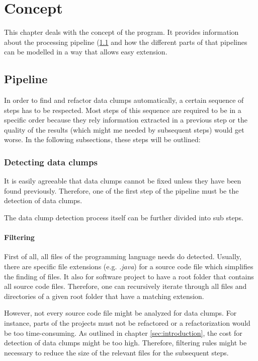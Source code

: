 \begingroup
\renewcommand{\cleardoublepage}{} %
\renewcommand{\clearpage}{}
\chapter{Concept}\label{chapter_conception}
\endgroup
This chapter deals with  the concept of the program. It provides information about the processing pipeline (\ref{chapter:pipeline} and how the different parts of that pipelines can be modelled in a way that allows easy extension. 


\hfill
\section{Pipeline}\label{chapter:pipeline}
In order to find and refactor data clumps automatically, a certain sequence of steps has to be respected. Most steps of this sequence are required to be in a specific order because they rely information extracted in a previous step or the quality of the results (which might me needed by subsequent steps) would get worse. In the following subsections, these steps will be outlined:

\subsection{Detecting data clumps}
It is easily agreeable that data clumps cannot be fixed unless they have been found previously. Therefore, one of the first step of the pipeline must be the detection of data clumps. 

The data clump detection process itself can be further divided into sub steps.
\subsubsection{Filtering}
First of all, all files of the programming language needs do detected. Usually, there are specific file extensions (e.g. \textit{.java}) for a source code file which simplifies the finding of files. It also for software project to have a root folder that contains all source code files. Therefore, one can recursively iterate through all files and directories of a given root folder that have a matching extension. 

However, not every source code file might be analyzed for data clumps. For instance, parts of the projects must not be refactored or a refactorization would be too time-consuming. As outlined in chapter \ref{sec:introduction}, the cost for detection of data clumps might be too high. Therefore, filtering rules might be necessary to reduce the size of the relevant files for the subsequent steps.  

